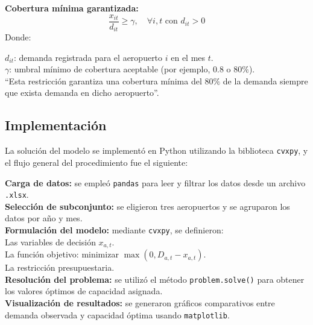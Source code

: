 \documentclass[11pt, a4paper, twocolumn]{article}
\begin{document}
\textbf{Cobertura mínima garantizada:}
    \[
    \frac{x_{it}}{d_{it}} \geq \gamma, \quad \forall i,t \text{ con } d_{it} > 0
    \]
    Donde:
    
        $d_{it}$: demanda registrada para el aeropuerto $i$ en el mes $t$.\\
        
        $\gamma$: umbral mínimo de cobertura aceptable (por ejemplo, $0.8$ o $80\%$).\\

“Esta restricción garantiza una cobertura mínima del $80\%$ de la demanda siempre que exista demanda en dicho aeropuerto”.
    
\subsection{Implementación}

La solución del modelo se implementó en Python utilizando la biblioteca \texttt{cvxpy}, y el flujo general del procedimiento fue el siguiente:

  \textbf{Carga de datos:} se empleó \texttt{pandas} para leer y filtrar los datos desde un archivo \texttt{.xlsx}.\\
  
  \textbf{Selección de subconjunto:} se eligieron tres aeropuertos y se agruparon los datos por año y mes.\\
  
  \textbf{Formulación del modelo:} mediante \texttt{cvxpy}, se definieron:\\
  
      Las variables de decisión $x_{a,t}$.\\
      
      La función objetivo: minimizar $\max(0, D_{a,t} - x_{a,t})$.\\
      
      La restricción presupuestaria.\\
    
  \textbf{Resolución del problema:} se utilizó el método \texttt{problem.solve()} para obtener los valores óptimos de capacidad asignada.\\
  
  \textbf{Visualización de resultados:} se generaron gráficos comparativos entre demanda observada y capacidad óptima usando \texttt{matplotlib}.
\end{document}
